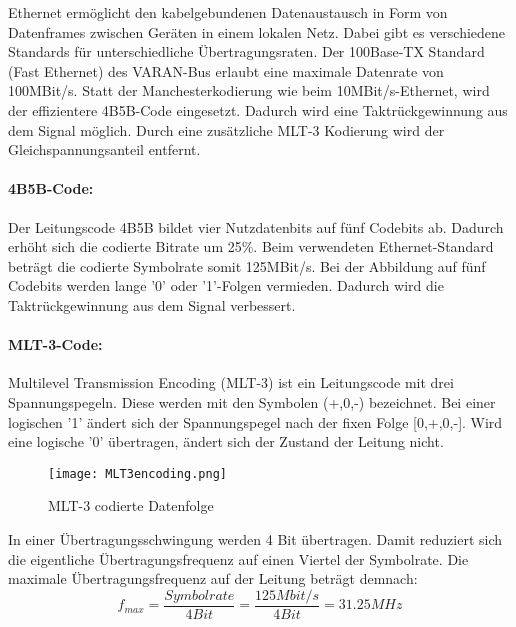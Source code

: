 Ethernet ermöglicht den kabelgebundenen Datenaustausch in Form von Datenframes zwischen Geräten in einem lokalen Netz. Dabei gibt es verschiedene Standards für unterschiedliche Übertragungsraten. Der 100Base-TX Standard (Fast Ethernet) des VARAN-Bus erlaubt eine maximale Datenrate von 100MBit/s. Statt der Manchesterkodierung wie beim 10MBit/s-Ethernet, wird der effizientere 4B5B-Code eingesetzt. Dadurch wird eine Taktrückgewinnung aus dem Signal möglich. Durch eine zusätzliche MLT-3 Kodierung wird der Gleichspannungsanteil entfernt.

\paragraph{4B5B-Code:}
Der Leitungscode 4B5B bildet vier Nutzdatenbits auf fünf Codebits ab. Dadurch erhöht sich die codierte Bitrate um 25\%. Beim verwendeten Ethernet-Standard beträgt die codierte Symbolrate somit 125MBit/s. Bei der Abbildung auf fünf Codebits werden lange '0' oder '1'-Folgen vermieden. Dadurch wird die Taktrückgewinnung aus dem Signal verbessert. 

\paragraph{MLT-3-Code:}
Multilevel Transmission Encoding (MLT-3) ist ein Leitungscode mit drei Spannungspegeln. Diese werden mit den Symbolen (+,0,-) bezeichnet. Bei einer logischen '1' ändert sich der Spannungspegel nach der fixen Folge [0,+,0,-]. Wird eine logische '0' übertragen, ändert sich der Zustand der Leitung nicht.
\begin{figure}[h]
\centering
\texttt{[image: MLT3encoding.png]}
\caption{MLT-3 codierte Datenfolge}\label{fig:MLT3code}
\end{figure}

In einer Übertragungsschwingung werden 4 Bit übertragen. Damit reduziert sich die eigentliche Übertragungsfrequenz auf einen Viertel der Symbolrate. Die maximale Übertragungsfrequenz auf der Leitung beträgt demnach: 
\begin{equation}\label{eq:MLT3}
f_{max}=\frac{Symbolrate}{4 Bit}=\frac{125Mbit/s}{4 Bit}=31.25 MHz
\end{equation}

